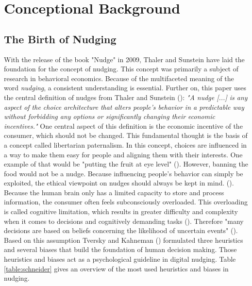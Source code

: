 \section{Conceptional Background}

\subsection{ The Birth of Nudging}
With the release of the book "Nudge" in 2009, Thaler and Sunstein have laid the foundation for the concept of nudging. This concept was primarily a subject of research in behavioral economics. Because of the multifaceted meaning of the word \textit{nudging}, a consistent understanding is essential. Further on, this paper uses the central definition of nudges from Thaler and Sunstein (\citeyear[p.6]{thaler_nudge:_2009}): \textit{"A nudge [...] is any aspect of the choice architecture that alters people's behavior in a predictable way without forbidding any options or significantly changing their economic incentives."}
One central aspect of this definition is the economic incentive of the consumer, which should not be changed. This fundamental thought is the basis of a concept called libertarian paternalism. In this concept, choices are influenced in a way to make them easy for people and aligning them with their interests. One example of that would be "putting the fruit at eye level" (\cite[p.6]{thaler_nudge:_2009}). However, banning the food would not be a nudge. Because influencing people's behavior can simply be exploited, the ethical viewpoint on nudges should always be kept in mind. (\cite{sunstein_nudging_2015}).
\\

Because the human brain only has a limited capacity to store and process information, the consumer often feels subconsciously overloaded. This overloading is called cognitive limitation, which results in greater difficulty and complexity when it comes to decisions and cognitively demanding tasks (\cite{broniarczyk_decision_2014}). Therefore "many decisions are based on beliefs concerning the likelihood of uncertain events" (\cite[p.1124]{tversky_judgment_1974}). Based on this assumption Tversky and Kahneman (\citeyear{tversky_judgment_1974}) formulated three heuristics and several biases that build the foundation of human decision making. Those heuristics and biases act as a psychological guideline in digital nudging. Table \ref{table:schneider} gives an overview of the most used heuristics and biases in nudging.
\\

